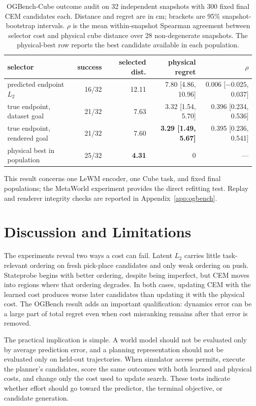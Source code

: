 \documentclass[10pt]{article}
\begin{document}
\begin{table}[H]
\centering
\scriptsize
\setlength{\tabcolsep}{3pt}
\caption{OGBench-Cube outcome audit on 32 independent
snapshots with 300 fixed final CEM candidates each. Distance and regret are in
cm; brackets are 95\% snapshot-bootstrap intervals. $\rho$ is the mean
within-snapshot Spearman agreement between selector cost and physical cube
distance over 28 non-degenerate snapshots. The physical-best row reports the
best candidate available in each population.}
\label{tab:ogbench}
\begin{tabular}{lrrrr}
\toprule
selector & success & selected dist. & physical regret & $\rho$ \\
\midrule
predicted endpoint $L_2$ & 16/32 & 12.11 & 7.80 [4.86, 10.96] & 0.006 [$-0.025$, 0.037] \\
true endpoint, dataset goal & 21/32 & 7.63 & 3.32 [1.54, 5.70] & 0.396 [0.234, 0.536] \\
true endpoint, rendered goal & 21/32 & 7.60 & \textbf{3.29 [1.49, 5.67]} & 0.395 [0.236, 0.541] \\
physical best in population & 25/32 & \textbf{4.31} & 0 & --- \\
\bottomrule
\end{tabular}
\end{table}

This result concerns one LeWM encoder, one Cube task, and fixed final
populations; the MetaWorld experiment provides the direct refitting test.
Replay and renderer integrity checks are reported in Appendix~\ref{app:ogbench}.

\section{Discussion and Limitations}\label{sec:discussion}

The experiments reveal two ways a cost can fail. Latent $L_2$ carries little
task-relevant ordering on fresh pick-place candidates and only weak ordering on
push. Stateprobe begins with better ordering, despite being imperfect, but CEM
moves into regions where that ordering degrades. In both cases, updating CEM
with the learned cost produces worse later candidates than updating it with the
physical cost. The OGBench result adds an important qualification: dynamics
error can be a large part of total regret even when cost misranking remains
after that error is removed.

The practical implication is simple. A world model should not be evaluated
only by average prediction error, and a planning representation should not be
evaluated only on held-out trajectories. When simulator access permits, execute
the planner's candidates, score the same outcomes with both learned and
physical costs, and change only the cost used to update search. These tests
indicate whether effort should go
toward the predictor, the terminal objective, or candidate generation.
\end{document}
